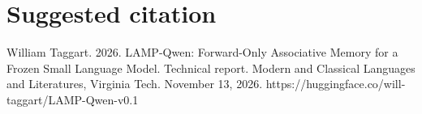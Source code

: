 \documentclass[manuscript,screen,nonacm]{acmart}
\begin{document}



\section*{Suggested citation}
William Taggart. 2026. LAMP-Qwen: Forward-Only Associative Memory for a Frozen Small Language Model. Technical report. Modern and Classical Languages and Literatures, Virginia Tech. November 13, 2026. https://huggingface.co/will-taggart/LAMP-Qwen-v0.1
\end{document}
